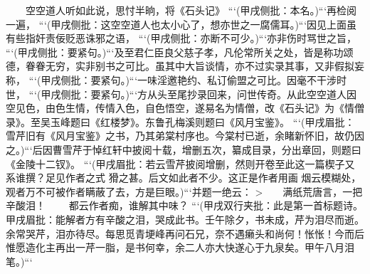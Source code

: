 \documentclass[
    ref = refDemo.bib,
    coverpage = cover.pdf,
    geometry = b5,
    lang = cn
]{spBook}
\begin{document}
    　　空空道人听如此说，思忖半晌，将《石头记》 ```(甲戌侧批：本名。)```再检阅一遍， ```(甲戌侧批：这空空道人也太小心了，想亦世之一腐儒耳。)```因见上面虽有些指奸责佞贬恶诛邪之语， ```(甲戌侧批：亦断不可少。)```亦非伤时骂世之旨， ```(甲戌侧批：要紧句。)```及至君仁臣良父慈子孝，凡伦常所关之处，皆是称功颂德，眷眷无穷，实非别书之可比。虽其中大旨谈情，亦不过实录其事，又非假拟妄称， ```(甲戌侧批：要紧句。)```一味淫邀艳约、私订偷盟之可比。因毫不干涉时世， ```(甲戌侧批：要紧句。)```方从头至尾抄录回来，问世传奇。从此空空道人因空见色，由色生情，传情入色，自色悟空，遂易名为情僧，改《石头记》为《情僧录》。至吴玉峰题曰《红楼梦》。东鲁孔梅溪则题曰《风月宝鉴》。 ```(甲戌眉批：雪芹旧有《风月宝鉴》之书，乃其弟棠村序也。今棠村已逝，余睹新怀旧，故仍因之。)```后因曹雪芹于悼红轩中披阅十载，增删五次，纂成目录，分出章回，则题曰《金陵十二钗》。 ```(甲戌眉批：若云雪芹披阅增删，然则开卷至此这一篇楔子又系谁撰？足见作者之式 猾之甚。后文如此者不少。这正是作者用画 烟云模糊处，观者万不可被作者瞒蔽了去，方是巨眼。)```并题一绝云：  
    >　　满纸荒唐言，一把辛酸泪！  
    　　都云作者痴，谁解其中味？ ```(甲戌双行夹批：此是第一首标题诗。甲戌眉批：能解者方有辛酸之泪，哭成此书。壬午除夕，书未成，芹为泪尽而逝。余常哭芹，泪亦待尽。每思觅青埂峰再问石兄，奈不遇癞头和尚何！怅怅！今而后惟愿造化主再出一芹一脂，是书何幸，余二人亦大快遂心于九泉矣。甲午八月泪笔。)```  
\end{document}
